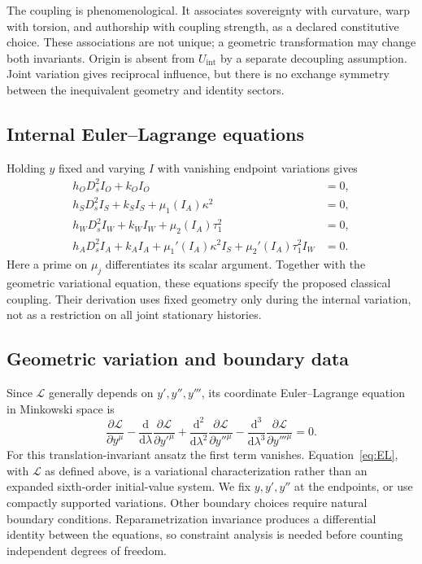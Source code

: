 \documentclass[11pt]{article}
\newcommand{\dd}{\mathrm d}
\newcommand{\Ds}{D_s}
\newcommand{\U}{U_{\mathrm{int}}}
\begin{document}
The coupling is phenomenological. It associates sovereignty with curvature, warp with torsion, and authorship with coupling strength, as a declared constitutive choice. These associations are not unique; a geometric transformation may change both invariants. Origin is absent from $\U$ by a separate decoupling assumption. Joint variation gives reciprocal influence, but there is no exchange symmetry between the inequivalent geometry and identity sectors.

\subsection{Internal Euler--Lagrange equations}
Holding $y$ fixed and varying $I$ with vanishing endpoint variations gives
\begin{align}
 h_O\Ds^2 I_O+k_O I_O&=0,\label{eq:origin}\\
 h_S\Ds^2 I_S+k_S I_S+\mu_1(I_A)\kappa^2&=0,\label{eq:S}\\
 h_W\Ds^2 I_W+k_W I_W+\mu_2(I_A)\tau_1^2&=0,\label{eq:W}\\
 h_A\Ds^2 I_A+k_A I_A
 +\mu_1'(I_A)\kappa^2 I_S+\mu_2'(I_A)\tau_1^2 I_W&=0.\label{eq:A}
\end{align}
Here a prime on $\mu_j$ differentiates its scalar argument. Together with the geometric variational equation, these equations specify the proposed classical coupling. Their derivation uses fixed geometry only during the internal variation, not as a restriction on all joint stationary histories.

\subsection{Geometric variation and boundary data}
Since $\mathcal L$ generally depends on $y',y'',y'''$, its coordinate Euler--Lagrange equation in Minkowski space is
\begin{equation}
 \frac{\partial\mathcal L}{\partial y^\mu}
 -\frac{\dd}{\dd\lambda}\frac{\partial\mathcal L}{\partial y'^\mu}
 +\frac{\dd^2}{\dd\lambda^2}\frac{\partial\mathcal L}{\partial y''^\mu}
 -\frac{\dd^3}{\dd\lambda^3}\frac{\partial\mathcal L}{\partial y'''^\mu}=0.
 \label{eq:EL}
\end{equation}
For this translation-invariant ansatz the first term vanishes. Equation~\eqref{eq:EL}, with $\mathcal L$ as defined above, is a variational characterization rather than an expanded sixth-order initial-value system. We fix $y,y',y''$ at the endpoints, or use compactly supported variations. Other boundary choices require natural boundary conditions. Reparametrization invariance produces a differential identity between the equations, so constraint analysis is needed before counting independent degrees of freedom.
\end{document}

